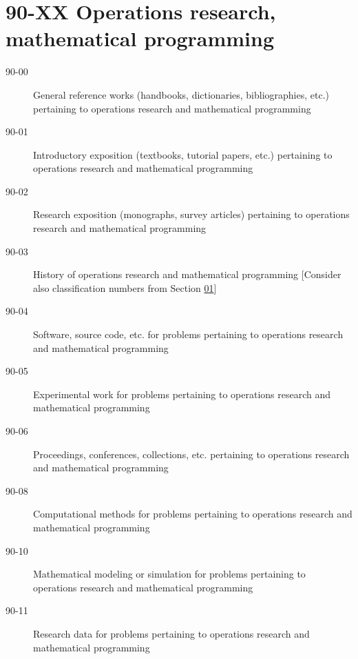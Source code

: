 \documentclass[letterpaper]{article}
\begin{document}
\section*{90-XX Operations research, mathematical programming }\label{90-XX}
\begin{description}
\item [90-00]\label{90-00} General reference works (handbooks, dictionaries, bibliographies, etc.) pertaining to operations research and mathematical programming
\item [90-01]\label{90-01} Introductory exposition (textbooks, tutorial papers, etc.) pertaining to operations research and mathematical programming
\item [90-02]\label{90-02} Research exposition (monographs, survey articles) pertaining to operations research and mathematical programming
\item [90-03]\label{90-03} History of operations research and mathematical programming [Consider also classification numbers from Section \hyperref[01-XX]{01}]
\item [90-04]\label{90-04} Software, source code, etc. for problems pertaining to operations research and mathematical programming
\item [90-05]\label{90-05} Experimental work for problems pertaining to operations research and mathematical programming
\item [90-06]\label{90-06} Proceedings, conferences, collections, etc. pertaining to operations research and mathematical programming
\item [90-08]\label{90-08} Computational methods for problems pertaining to operations research and mathematical programming
\item [90-10]\label{90-10} Mathematical modeling or simulation for problems pertaining to operations research and mathematical programming
\item [90-11]\label{90-11} Research data for problems pertaining to operations research and mathematical programming
\end{description}
\end{document}
